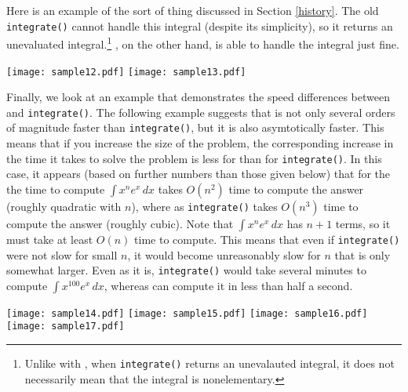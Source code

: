 Here is an example of the sort of thing discussed in Section
\ref{history}.  The old \texttt{integrate()} cannot handle this integral
(despite its simplicity), so it returns an unevaluated
integral.\footnote{Unlike with \rischintegrate{}, when
\texttt{integrate()} returns an unevalauted integral, it does not
necessarily mean that the integral is nonelementary.} 
\rischintegrate{}, on the other hand, is able to handle the integral
just fine.

\begin{flushleft}
\texttt{[image: sample12.pdf]}
\texttt{[image: sample13.pdf]}
\end{flushleft}

Finally, we look at an example that demonstrates the speed differences
between \rischintegrate{} and \texttt{integrate()}.  The following
example suggests that \rischintegrate{} is not only several orders of
magnitude faster than \texttt{integrate()}, but it is also asymtotically
faster.  This means that if you increase the size of the problem, the
corresponding increase in the time it takes to solve the problem is less
for \rischintegrate{} than for \texttt{integrate()}.  In this case, it
appears (based on further numbers than those given below) that for the
the time to compute $\int{x^ne^x\,dx}$ \rischintegrate{} takes $O(n^2)$
time to compute the answer (roughly quadratic with $n$), where as
\texttt{integrate()} takes $O(n^3)$ time to compute the answer (roughly
cubic).  Note that $\int{x^ne^x\,dx}$ has $n + 1$ terms, so it must take
at least $O(n)$ time to compute.  This means that even if
\texttt{integrate()} were not slow for small $n$, it would become
unreasonably slow for $n$ that is only somewhat larger.  Even as it is,
\texttt{integrate()} would take several minutes to compute
$\int{x^{100}e^x\,dx}$, whereas \rischintegrate{} can compute it in less
than half a second.

\begin{flushleft}
\texttt{[image: sample14.pdf]}
\texttt{[image: sample15.pdf]}
\texttt{[image: sample16.pdf]}
\texttt{[image: sample17.pdf]}
\end{flushleft}
